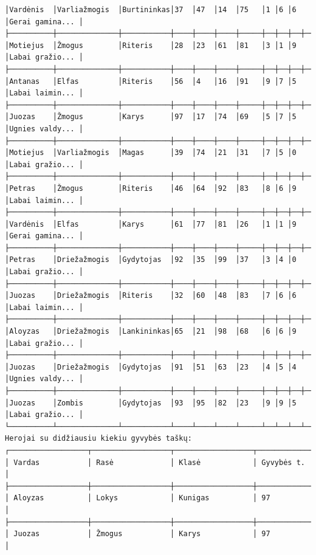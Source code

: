 \documentclass{article}
\begin{document}
\begin{verbatim}
│Vardėnis  │Varliažmogis  │Burtininkas│37  │47  │14  │75   │1 │6 │6 │Gerai gamina... │
├──────────┼──────────────┼───────────┼────┼────┼────┼─────┼──┼──┼──┼────────────────┤
│Motiejus  │Žmogus        │Riteris    │28  │23  │61  │81   │3 │1 │9 │Labai gražio... │
├──────────┼──────────────┼───────────┼────┼────┼────┼─────┼──┼──┼──┼────────────────┤
│Antanas   │Elfas         │Riteris    │56  │4   │16  │91   │9 │7 │5 │Labai laimin... │
├──────────┼──────────────┼───────────┼────┼────┼────┼─────┼──┼──┼──┼────────────────┤
│Juozas    │Žmogus        │Karys      │97  │17  │74  │69   │5 │7 │5 │Ugnies valdy... │
├──────────┼──────────────┼───────────┼────┼────┼────┼─────┼──┼──┼──┼────────────────┤
│Motiejus  │Varliažmogis  │Magas      │39  │74  │21  │31   │7 │5 │0 │Labai gražio... │
├──────────┼──────────────┼───────────┼────┼────┼────┼─────┼──┼──┼──┼────────────────┤
│Petras    │Žmogus        │Riteris    │46  │64  │92  │83   │8 │6 │9 │Labai laimin... │
├──────────┼──────────────┼───────────┼────┼────┼────┼─────┼──┼──┼──┼────────────────┤
│Vardėnis  │Elfas         │Karys      │61  │77  │81  │26   │1 │1 │9 │Gerai gamina... │
├──────────┼──────────────┼───────────┼────┼────┼────┼─────┼──┼──┼──┼────────────────┤
│Petras    │Driežažmogis  │Gydytojas  │92  │35  │99  │37   │3 │4 │0 │Labai gražio... │
├──────────┼──────────────┼───────────┼────┼────┼────┼─────┼──┼──┼──┼────────────────┤
│Juozas    │Driežažmogis  │Riteris    │32  │60  │48  │83   │7 │6 │6 │Labai laimin... │
├──────────┼──────────────┼───────────┼────┼────┼────┼─────┼──┼──┼──┼────────────────┤
│Aloyzas   │Driežažmogis  │Lankininkas│65  │21  │98  │68   │6 │6 │9 │Labai gražio... │
├──────────┼──────────────┼───────────┼────┼────┼────┼─────┼──┼──┼──┼────────────────┤
│Juozas    │Driežažmogis  │Gydytojas  │91  │51  │63  │23   │4 │5 │4 │Ugnies valdy... │
├──────────┼──────────────┼───────────┼────┼────┼────┼─────┼──┼──┼──┼────────────────┤
│Juozas    │Zombis        │Gydytojas  │93  │95  │82  │23   │9 │9 │5 │Labai gražio... │
└──────────┴──────────────┴───────────┴────┴────┴────┴─────┴──┴──┴──┴────────────────┘
Herojai su didžiausiu kiekiu gyvybės taškų:
┌──────────────────┬──────────────────┬──────────────────┬──────────────────┐
│ Vardas           │ Rasė             │ Klasė            │ Gyvybės t.       │
├──────────────────┼──────────────────┼──────────────────┼──────────────────┤
│ Aloyzas          │ Lokys            │ Kunigas          │ 97               │
├──────────────────┼──────────────────┼──────────────────┼──────────────────┤
│ Juozas           │ Žmogus           │ Karys            │ 97               │

\end{verbatim}
\end{document}
